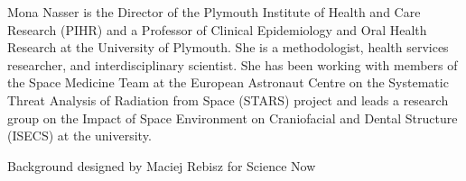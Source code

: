 \documentclass[a4paper,parskip,10pt]{scrartcl}
\begin{document}
\begin{tcolorbox}
        {
            \small
            \color{white!20!black}
            Mona Nasser is the Director of the Plymouth Institute of Health and Care Research (PIHR) and a Professor of Clinical Epidemiology and Oral Health Research at the University of Plymouth. She is a methodologist, health services researcher, and interdisciplinary scientist. She has been working with members of the Space Medicine Team at the European Astronaut Centre on the Systematic Threat Analysis of Radiation from Space (STARS) project and leads a research group on the Impact of Space Environment on Craniofacial and Dental Structure (ISECS) at the university.}

        

        \vspace{2ex}
    \end{tcolorbox}
    \vspace{-1ex}



\vfill

\begin{tcolorbox}[
    width=\paperwidth,center,boxrule=0pt,arc=0pt,auto outer arc,colframe=white,colback=white,valign=center]
    \hfill
    \hfill
    \hfill
    \hfill
    \hfill
    \hfill
    \hfill
\end{tcolorbox}

\begin{center}%
\color{white!80!black}%
Background designed by Maciej Rebisz for Science Now
\end{center}

\vspace{1cm}
\end{document}
